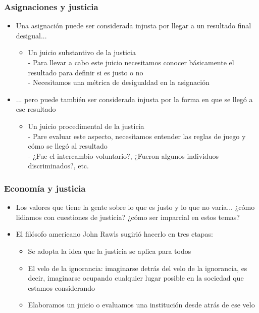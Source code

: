 \documentclass{beamer}
\begin{document}
\begin{frame}
\frametitle{ Asignaciones y justicia}
\begin{itemize}
    \item Una asignación puede ser considerada injusta por llegar a un resultado final desigual...
    \begin{itemize}
        \item Un juicio substantivo de la justicia \\
        - Para llevar a cabo este juicio necesitamos conocer básicamente el resultado para definir si es justo o no \\
        - Necesitamos una métrica de desigualdad en la asignación
    \end{itemize}
    \item ... pero puede también ser considerada injusta por la forma en que se llegó a ese resultado
    \begin{itemize}
        \item Un juicio procedimental de la justicia \\
        - Pare evaluar este aspecto, necesitamos entender las reglas de juego y cómo se llegó al resultado \\
        - ¿Fue el intercambio voluntario?, ¿Fueron algunos individuos discriminados?, etc.
    \end{itemize}
\end{itemize}
\end{frame}

\begin{frame}
\frametitle{ Economía y justicia}
\begin{itemize}
    \item Los valores que tiene la gente sobre lo que es justo y lo que no varía... ¿cómo lidiamos con cuestiones de justicia? ¿cómo ser imparcial en estos temas?
    \item El filósofo americano John Rawls sugirió hacerlo en tres etapas:
    \begin{itemize}
        \item Se adopta la idea que la justicia se aplica para todos
        \item El velo de la ignorancia: imaginarse detrás del velo de la ignorancia, es decir, imaginarse ocupando cualquier lugar posible en la sociedad que estamos considerando
        \item Elaboramos un juicio o evaluamos una institución desde atrás de ese velo
    \end{itemize}
\end{itemize}
\end{frame}
\end{document}
